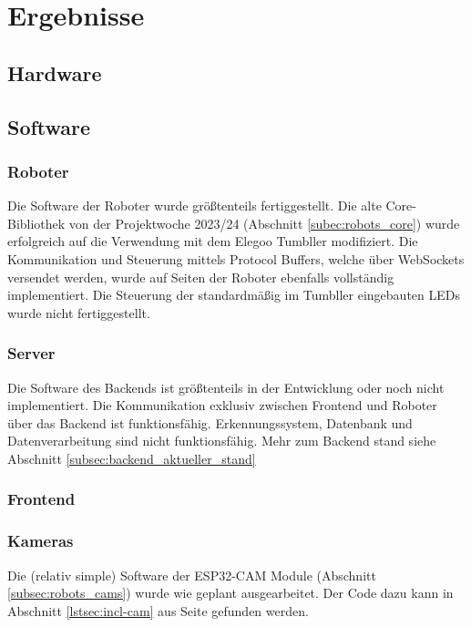 \chapter{Ergebnisse}

\section{Hardware}

\section{Software}

\subsection{Roboter}
Die Software der Roboter wurde größtenteils fertiggestellt.
%
Die alte Core-Bibliothek von der Projektwoche 2023/24 (Abschnitt \ref{subec:robots_core})
wurde erfolgreich auf die Verwendung mit dem Elegoo Tumbller modifiziert.
%
Die Kommunikation und Steuerung mittels Protocol Buffers,
welche über WebSockets versendet werden,
wurde auf Seiten der Roboter ebenfalls vollständig implementiert.
%
Die Steuerung der standardmäßig im Tumbller eingebauten LEDs wurde nicht fertiggestellt.
\subsection{Server}
Die Software des Backends ist größtenteils in der Entwicklung 
oder noch nicht implementiert.
% 
Die Kommunikation exklusiv zwischen Frontend und Roboter 
über das Backend ist funktionsfähig.
% 
Erkennungssystem, Datenbank und Datenverarbeitung sind nicht funktionsfähig.
% 
% 
Mehr zum Backend stand siehe Abschnitt \ref{subsec:backend_aktueller_stand}
% 
\subsection{Frontend}

\subsection{Kameras}
Die (relativ simple) Software der ESP32-CAM Module (Abschnitt \ref{subsec:robots_cams})
wurde wie geplant ausgearbeitet.
%
Der Code dazu kann in Abschnitt \ref{lstsec:incl-cam} aus Seite \pageref{lstsec:incl-cam} gefunden werden.